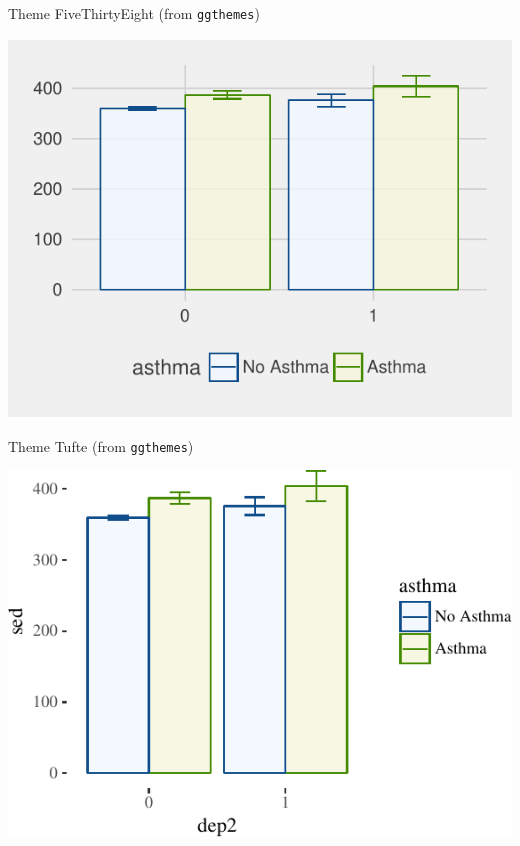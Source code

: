 \begin{frame}[fragile]{Theme FiveThirtyEight (from \texttt{ggthemes})}

\begin{Shaded}
\begin{Highlighting}[]
\OperatorTok{+}\StringTok{ }
\StringTok{  }\NormalTok{()}
\end{Highlighting}
\end{Shaded}

\includegraphics{09_AdvancedPlotting_files/figure-beamer/unnamed-chunk-10-1.pdf}

\end{frame}

\begin{frame}[fragile]{Theme Tufte (from \texttt{ggthemes})}

\begin{Shaded}
\begin{Highlighting}[]
\OperatorTok{+}\StringTok{ }
\StringTok{  }\NormalTok{()}
\end{Highlighting}
\end{Shaded}

\includegraphics{09_AdvancedPlotting_files/figure-beamer/unnamed-chunk-11-1.pdf}

\end{frame}

